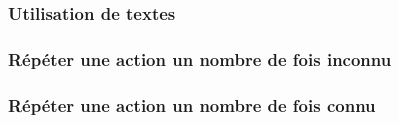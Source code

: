 \subsubsection{Utilisation de textes}
    

\subsubsection{Répéter une action un nombre de fois \og inconnu \fg}
    

\subsubsection{Répéter une action un nombre de fois \og connu \fg}
    
